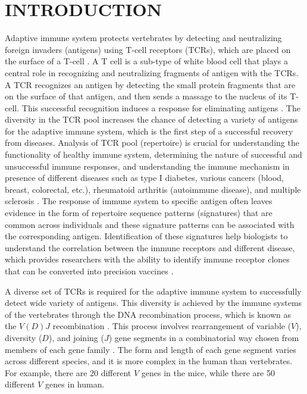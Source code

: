 \chapter{INTRODUCTION\label{chapter:introduction}}

Adaptive immune system protects vertebrates by detecting and neutralizing foreign invaders (antigens) using T-cell receptors (TCRs), which are placed on the surface of a T-cell \cite{b3}. A T cell is a sub-type of white blood cell that plays a central role in recognizing and neutralizing fragments of antigen with the TCRs. A TCR recognizes an antigen by detecting the small protein fragments that are on the surface of that antigen, and then sends a massage to the nucleus of its T-cell. This successful recognition induces a response for eliminating antigens \cite{b9}. The diversity in the TCR pool increases the chance of detecting a variety of antigens for the adaptive immune system, which is the first step of a successful recovery from diseases. Analysis of TCR pool (repertoire) is crucial for understanding the functionality of healthy immune system, determining the nature of successful and unsuccessful immune responses, and understanding the immune mechanism in presence of different diseases such as type I diabetes, various cancers (blood, breast, colorectal, etc.), rheumatoid arthritis (autoimmune disease), and  multiple sclerosis \cite{b6}. The response of immune system to specific antigen often leaves evidence in the form of repertoire sequence patterns (signatures) that are common across individuals and these signature patterns can be associated with the corresponding antigen. Identification of these signatures help biologists to understand the correlation between the immune receptors and different disease, which provides researchers with the ability to identify immune receptor clones that can be converted into precision vaccines \cite{b1, b7, b8}.

A diverse set of TCRs is required for the adaptive immune system to successfully detect wide variety of antigens. This diversity is achieved by the immune systems of the vertebrates through the DNA recombination process, which is known as the $V(D)J$ recombination \cite{b4}. This process involves rearrangement of variable ($V$), diversity ($D$), and joining ($J$) gene segments in a combinatorial way chosen from members of each gene family \cite{b4,b5}. The form and length of each gene segment varies across different species, and it is more complex in the human than vertebrates. For example, there are 20 different $V$ genes in the mice, while there are 50 different $V$ genes in human. 

